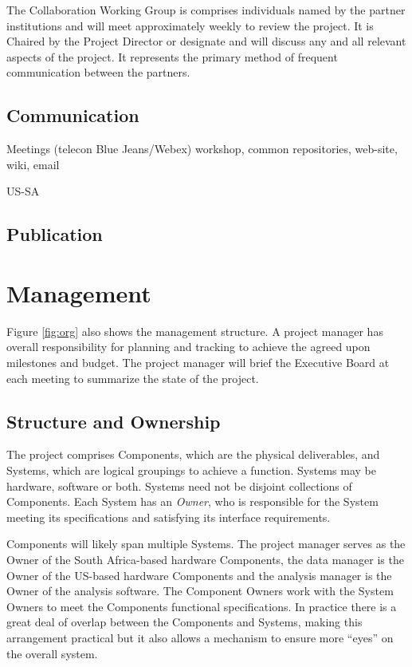 \documentclass[preprint]{aastex}
\begin{document}
The Collaboration Working Group is comprises individuals named by the partner
institutions and will meet approximately weekly to review the project. It is Chaired
by the Project Director or designate and will discuss any and all relevant aspects of
the project. It represents the primary method of frequent communication between the
partners.

\subsection{Communication}
Meetings (telecon Blue Jeans/Webex)  workshop, common repositories, web-site, wiki, email

US-SA

\subsection{Publication}


\section{Management}
Figure \ref{fig:org} also shows the management structure.   A project manager has
overall responsibility for planning and tracking to achieve the agreed upon
milestones and budget. The project manager will brief the Executive Board at each
meeting to summarize the state of the project.  

\subsection{Structure and Ownership}
The project comprises Components, which are the physical deliverables, and Systems,
which are logical groupings to achieve a function. Systems may be hardware, software
or both. Systems need not be disjoint collections of Components. Each System has an
{\em Owner}, who is responsible for the System meeting its specifications and satisfying
its interface requirements.

Components will likely span multiple Systems. The project
manager serves as the Owner of the South Africa-based hardware Components, the data
manager is the Owner of the US-based hardware Components and the analysis manager is 
the Owner of the analysis software.  The Component Owners work with the System Owners 
to meet the Components functional specifications.  In practice there is a great deal of overlap
between the Components and Systems, making this arrangement practical but it also allows
a mechanism to ensure more ``eyes'' on the overall system.
\end{document}
